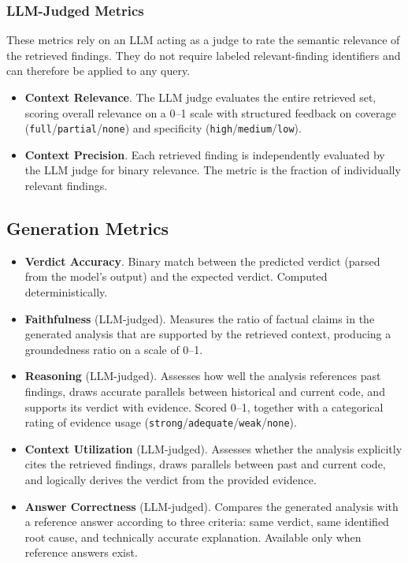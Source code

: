 \subsubsection*{LLM-Judged Metrics}
These metrics rely on an LLM acting as a judge to rate the semantic relevance of the retrieved findings. They do not require labeled relevant-finding identifiers and can therefore be applied to any query.

\begin{itemize}
    \item \textbf{Context Relevance}. The LLM judge evaluates the entire retrieved set, scoring overall relevance on a 0--1 scale with structured feedback on coverage (\texttt{full}/\texttt{partial}/\texttt{none}) and specificity (\texttt{high}/\texttt{medium}/\texttt{low}).

    \item \textbf{Context Precision}. Each retrieved finding is independently evaluated by the LLM judge for binary relevance. The metric is the fraction of individually relevant findings.
\end{itemize}


\subsection{Generation Metrics}
\label{subsec:generation-metrics}

\begin{itemize}
    \item \textbf{Verdict Accuracy}. Binary match between the predicted verdict (parsed from the model's output) and the expected verdict. Computed deterministically.

    \item \textbf{Faithfulness} (LLM-judged). Measures the ratio of factual claims in the generated analysis that are supported by the retrieved context, producing a groundedness ratio on a scale of 0--1.

    \item \textbf{Reasoning} (LLM-judged). Assesses how well the analysis references past findings, draws accurate parallels between historical and current code, and supports its verdict with evidence. Scored 0--1, together with a categorical rating of evidence usage (\texttt{strong}/\texttt{adequate}/\texttt{weak}/\texttt{none}).

    \item \textbf{Context Utilization} (LLM-judged). Assesses whether the analysis explicitly cites the retrieved findings, draws parallels between past and current code, and logically derives the verdict from the provided evidence.

    \item \textbf{Answer Correctness} (LLM-judged). Compares the generated analysis with a reference answer according to three criteria: same verdict, same identified root cause, and technically accurate explanation. Available only when reference answers exist.
\end{itemize}


